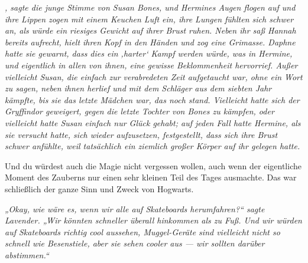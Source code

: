 \emph{, sagte die junge Stimme von Susan Bones, und Hermines Augen flogen auf und ihre Lippen zogen mit einem Keuchen Luft ein, ihre Lungen fühlten sich schwer an, als würde ein riesiges Gewicht auf ihrer Brust ruhen. Neben ihr saß Hannah bereits aufrecht, hielt ihren Kopf in den Händen und zog eine Grimasse. Daphne hatte sie gewarnt, dass dies ein ‚harter‘ Kampf werden würde, was in Hermine, und eigentlich in allen von ihnen, eine gewisse Beklommenheit hervorrief. Außer vielleicht Susan, die einfach zur verabredeten Zeit aufgetaucht war, ohne ein Wort zu sagen, neben ihnen herlief und mit dem Schläger aus dem siebten Jahr kämpfte, bis sie das letzte Mädchen war, das noch stand. Vielleicht hatte sich der Gryffindor geweigert, gegen die letzte Tochter von Bones zu kämpfen, oder vielleicht hatte Susan einfach nur Glück gehabt; auf jeden Fall hatte Hermine, als sie versucht hatte, sich wieder aufzusetzen, festgestellt, dass sich ihre Brust schwer anfühlte, weil tatsächlich ein ziemlich großer Körper auf ihr gelegen hatte.}

Und du würdest auch die Magie nicht vergessen wollen, auch wenn der eigentliche Moment des Zauberns nur einen sehr kleinen Teil des Tages ausmachte. Das war schließlich der ganze Sinn und Zweck von Hogwarts.

\emph{„Okay, wie wäre es, wenn wir alle auf Skateboards herumfahren?“ sagte Lavender.
„Wir könnten schneller überall hinkommen als zu Fuß. Und wir würden auf Skateboards richtig cool aussehen, Muggel-Geräte sind vielleicht nicht so schnell wie Besenstiele, aber sie sehen cooler aus — wir sollten darüber abstimmen.“}

